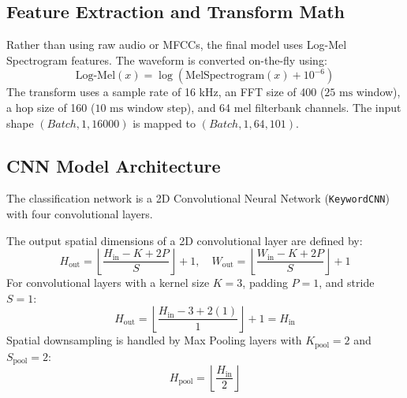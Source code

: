 \subsection{Feature Extraction and Transform Math}
Rather than using raw audio or MFCCs, the final model uses Log-Mel Spectrogram features. The waveform is converted on-the-fly using:
\begin{equation}
    \text{Log-Mel}(x) = \log(\text{MelSpectrogram}(x) + 10^{-6})
\end{equation}
The transform uses a sample rate of 16 kHz, an FFT size of 400 ($25\text{ ms}$ window), a hop size of 160 ($10\text{ ms}$ window step), and 64 mel filterbank channels. The input shape $(Batch, 1, 16000)$ is mapped to $(Batch, 1, 64, 101)$.

\subsection{CNN Model Architecture}
The classification network is a 2D Convolutional Neural Network (\texttt{KeywordCNN}) with four convolutional layers.

The output spatial dimensions of a 2D convolutional layer are defined by:
\begin{equation}
    H_{\text{out}} = \left\lfloor \frac{H_{\text{in}} - K + 2P}{S} \right\rfloor + 1, \quad W_{\text{out}} = \left\lfloor \frac{W_{\text{in}} - K + 2P}{S} \right\rfloor + 1
\end{equation}
For convolutional layers with a kernel size $K=3$, padding $P=1$, and stride $S=1$:
\begin{equation}
    H_{\text{out}} = \left\lfloor \frac{H_{\text{in}} - 3 + 2(1)}{1} \right\rfloor + 1 = H_{\text{in}}
\end{equation}
Spatial downsampling is handled by Max Pooling layers with $K_{\text{pool}}=2$ and $S_{\text{pool}}=2$:
\begin{equation}
    H_{\text{pool}} = \left\lfloor \frac{H_{\text{in}}}{2} \right\rfloor
\end{equation}


